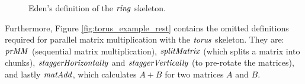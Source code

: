 \documentclass[paper=A4,twoside=true,openright,parskip=full,chapterprefix=true,headings=normal,bibliography=totoc,listof=totoc,titlepage=on,captions=tableabove,draft=false,british]{scrreprt}%
\begin{document}
\begin{figure}[H]
\resethooks
\caption{Eden's definition of the \ensuremath{\Varid{ring}} skeleton.}\label{fig:ringEden}\end{figure}

Furthermore, Figure \ref{fig:torus_example_rest} contains the omitted
definitions required for parallel matrix multiplication with the \ensuremath{\Varid{torus}}
skeleton. They are: \ensuremath{\Varid{prMM}} (sequential matrix multiplication),
\ensuremath{\Varid{splitMatrix}} (which splits a matrix into chunks), \ensuremath{\Varid{staggerHorizontally}}
and \ensuremath{\Varid{staggerVertically}} (to pre-rotate the matrices), and lastly
\ensuremath{\Varid{matAdd}}, which calculates \(A + B\) for two matrices \(A\) and \(B\).
\end{document}
